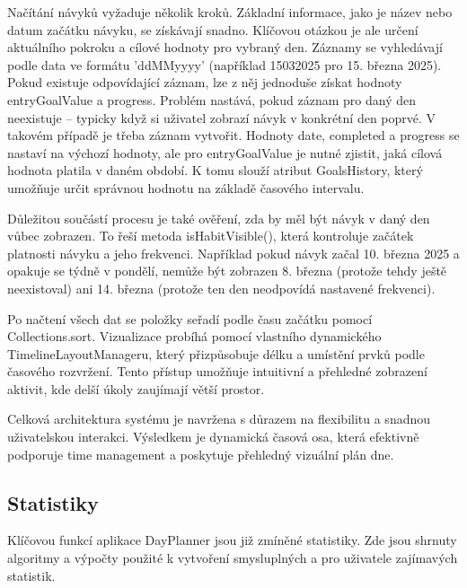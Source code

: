 Načítání návyků vyžaduje několik kroků. Základní informace, jako je název nebo datum začátku návyku, se získávají snadno. Klíčovou otázkou je ale určení aktuálního pokroku a cílové hodnoty pro vybraný den. Záznamy se vyhledávají podle data ve formátu 'ddMMyyyy' (například 15032025 pro 15. března 2025). Pokud existuje odpovídající záznam, lze z něj jednoduše získat hodnoty entryGoalValue a progress. Problém nastává, pokud záznam pro daný den neexistuje – typicky když si uživatel zobrazí návyk v konkrétní den poprvé. V takovém případě je třeba záznam vytvořit. Hodnoty date, completed a progress se nastaví na výchozí hodnoty, ale pro entryGoalValue je nutné zjistit, jaká cílová hodnota platila v daném období. K tomu slouží atribut GoalsHistory, který umožňuje určit správnou hodnotu na základě časového intervalu.

Důležitou součástí procesu je také ověření, zda by měl být návyk v daný den vůbec zobrazen. To řeší metoda isHabitVisible(), která kontroluje začátek platnosti návyku a jeho frekvenci. Například pokud návyk začal 10. března 2025 a opakuje se týdně v pondělí, nemůže být zobrazen 8. března (protože tehdy ještě neexistoval) ani 14. března (protože ten den neodpovídá nastavené frekvenci).

Po načtení všech dat se položky seřadí podle času začátku pomocí Collections.sort. Vizualizace probíhá pomocí vlastního dynamického TimelineLayoutManageru, který přizpůsobuje délku a umístění prvků podle časového rozvržení. Tento přístup umožňuje intuitivní a přehledné zobrazení aktivit, kde delší úkoly zaujímají větší prostor.

Celková architektura systému je navržena s důrazem na flexibilitu a snadnou uživatelskou interakci. Výsledkem je dynamická časová osa, která efektivně podporuje time management a poskytuje přehledný vizuální plán dne.

\newpage

\subsection{Statistiky}
\hspace{14pt} Klíčovou funkcí aplikace DayPlanner jsou již zmíněné statistiky. Zde jsou shrnuty algoritmy a výpočty použité k vytvoření smysluplných a pro uživatele zajímavých statistik.



